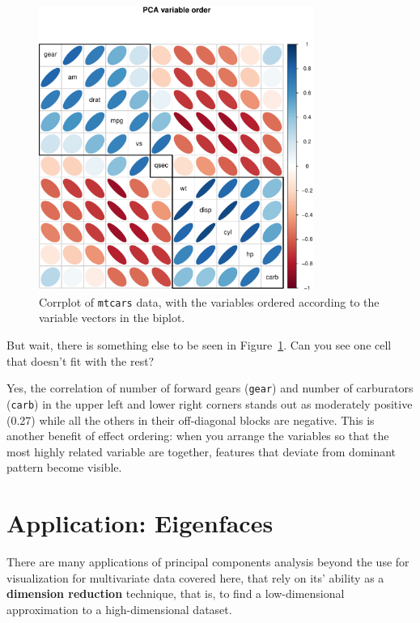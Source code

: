 \documentclass[
  letterpaper,
  10pt,
  krantz2]{krantz}
\begin{document}
{\begin{figure}[H]
{\includegraphics[width=0.8\textwidth,height=\textheight]{figs/ch04/fig-mtcars-corrplot-pcaorder-1.pdf}

}

\caption{\label{fig-mtcars-corrplot-pcaorder}Corrplot of \texttt{mtcars}
data, with the variables ordered according to the variable vectors in
the biplot.}

\end{figure}%

But wait, there is something else to be seen in
Figure~\ref{fig-mtcars-corrplot-pcaorder}. Can you see one cell that
doesn't fit with the rest?

Yes, the correlation of number of forward gears (\texttt{gear}) and
number of carburators (\texttt{carb}) in the upper left and lower right
corners stands out as moderately positive (0.27) while all the others in
their off-diagonal blocks are negative. This is another benefit of
effect ordering: when you arrange the variables so that the most highly
related variable are together, features that deviate from dominant
pattern become visible.

\section{Application: Eigenfaces}\label{application-eigenfaces}

There are many applications of principal components analysis beyond the
use for visualization for multivariate data covered here, that rely on
its' ability as a \textbf{dimension reduction} technique, that is, to
find a low-dimensional approximation to a high-dimensional dataset.

}
\end{document}
